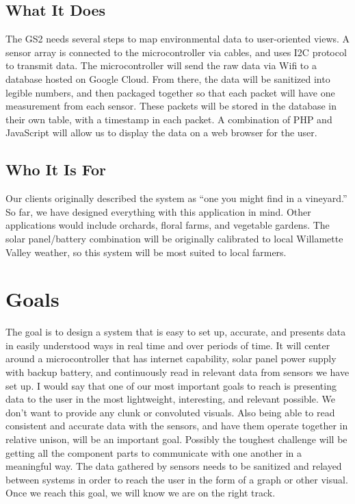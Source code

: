 \documentclass[IEEEtran,letterpaper,10pt,titlepage,fleqn,draftclsnofoot,onecolumn]{article}
\begin{document}
\subsection{What It Does}

The GS2 needs several steps to map environmental data to user-oriented views. A sensor array is connected to the microcontroller via cables, and uses I2C protocol to transmit data. The microcontroller will send the raw data via Wifi to a database hosted on Google Cloud. From there, the data will be sanitized into legible numbers, and then packaged together so that each packet will have one measurement from each sensor. These packets will be stored in the database in their own table, with a timestamp in each packet. A combination of PHP and JavaScript will allow us to display the data on a web browser for the user.

\subsection{Who It Is For}

Our clients originally described the system as “one you might find in a vineyard.” So far, we have designed everything with this application in mind. Other applications would include orchards, floral farms, and vegetable gardens. The solar panel/battery combination will be originally calibrated to local Willamette Valley weather, so this system will be most suited to local farmers. 

\section{Goals}

The goal is to design a system that is easy to set up, accurate, and presents data in easily understood ways in real time and over periods of time. It will center around a microcontroller that has internet capability, solar panel power supply with backup battery, and continuously read in relevant data from sensors we have set up. I would say that one of our most important goals to reach is presenting data to the user in the most lightweight, interesting, and relevant possible. We don’t want to provide any clunk or convoluted visuals. Also being able to read consistent and accurate data with the sensors, and have them operate together in relative unison, will be an important goal. Possibly the toughest challenge will be getting all the component parts to communicate with one another in a meaningful way. The data gathered by sensors needs to be sanitized and relayed between systems in order to reach the user in the form of a graph or other visual. Once we reach this goal, we will know we are on the right track.
\end{document}
